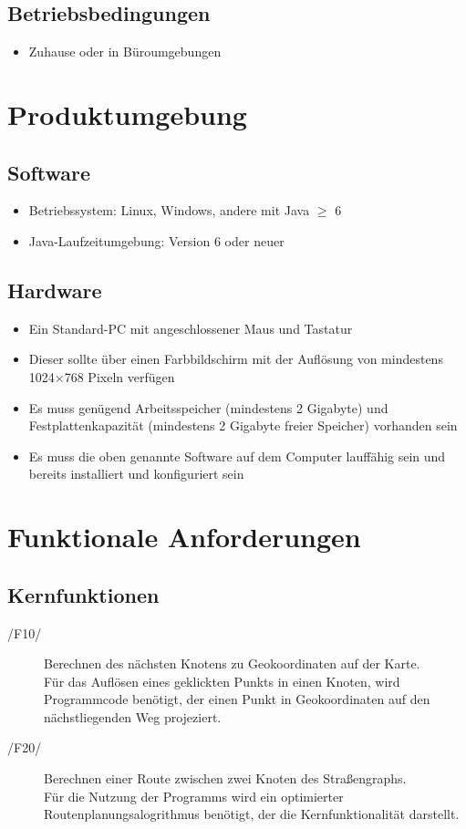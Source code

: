 \documentclass[a4paper, 11pt]{article}
\makeatletter
\def\namedlabel#1#2{\begingroup
    #2%
    \def\@currentlabel{#2}%
    \phantomsection\label{#1}\endgroup
}
\newcommand{\oitem}[1]{\item[\namedlabel{#1}{/#1/}]}
\makeatother
\begin{document}
\subsection{Betriebsbedingungen}
\begin{itemize}
\item Zuhause oder in Büroumgebungen
\end{itemize}

\section{Produktumgebung}

\subsection{Software}

\begin{itemize}
\item Betriebssystem: Linux, Windows, andere mit Java $\geq$ 6
\item Java-Laufzeitumgebung: Version 6 oder neuer
\end{itemize}

\subsection{Hardware}

\begin{itemize}
\item Ein Standard-PC mit angeschlossener Maus und Tastatur
\item Dieser sollte über einen Farbbildschirm mit der Auflösung von mindestens 1024$\times$768 Pixeln verfügen
\item Es muss genügend Arbeitsspeicher (mindestens 2 Gigabyte) und Festplattenkapazität (mindestens 2 Gigabyte freier Speicher) vorhanden sein
\item Es muss die oben genannte Software auf dem Computer lauffähig sein und bereits installiert und konfiguriert sein
\end{itemize}

\section{Funktionale Anforderungen}
\subsection{Kernfunktionen}
\begin{description}
\oitem{F10}
Berechnen des nächsten Knotens zu Geokoordinaten auf der Karte.\\
Für das Auflösen eines geklickten Punkts in einen Knoten, wird Programmcode benötigt, der einen Punkt in Geokoordinaten auf den nächstliegenden Weg projeziert.
\oitem{F20}
Berechnen einer Route zwischen zwei Knoten des Straßengraphs.\\
Für die Nutzung der Programms wird ein optimierter Routenplanungsalogrithmus benötigt, der die Kernfunktionalität darstellt.
\end{description}
\end{document}
